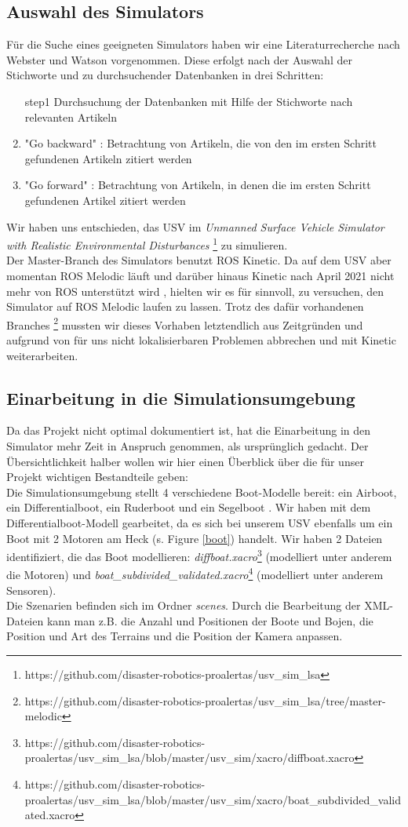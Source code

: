\documentclass[conference]{IEEEtran}
\begin{document}
\subsection{Auswahl des Simulators}
Für die Suche eines geeigneten Simulators haben wir eine Literaturrecherche nach Webster und Watson \cite{b9} vorgenommen. Diese erfolgt nach der Auswahl der Stichworte und zu durchsuchender Datenbanken in drei Schritten:
\begin{enumerate}
	\item[step1] Durchsuchung der Datenbanken mit Hilfe der Stichworte nach relevanten Artikeln
	\item "Go backward" \cite{b9}: Betrachtung von Artikeln, die von den im ersten Schritt gefundenen Artikeln zitiert werden
	\item "Go forward" \cite{b9}: Betrachtung von Artikeln, in denen die im ersten Schritt gefundenen Artikel zitiert werden
\end{enumerate}
Wir haben uns entschieden, das USV im \textit{Unmanned Surface Vehicle Simulator with Realistic Environmental Disturbances} \footnote{https://github.com/disaster-robotics-proalertas/usv\_sim\_lsa} zu simulieren.\\
Der Master-Branch des Simulators benutzt ROS Kinetic. Da auf dem USV aber momentan ROS Melodic läuft und darüber hinaus Kinetic nach April 2021 nicht mehr von ROS unterstützt wird \cite{b10}, hielten wir es für sinnvoll, zu versuchen, den Simulator auf ROS Melodic laufen zu lassen. Trotz des dafür vorhandenen Branches \footnote{https://github.com/disaster-robotics-proalertas/usv\_sim\_lsa/tree/master-melodic} mussten wir dieses Vorhaben letztendlich aus Zeitgründen und aufgrund von für uns nicht lokalisierbaren Problemen abbrechen und mit Kinetic weiterarbeiten.
\subsection{Einarbeitung in die Simulationsumgebung}
Da das Projekt nicht optimal dokumentiert ist, hat die Einarbeitung in den Simulator mehr Zeit in Anspruch genommen, als ursprünglich gedacht. Der Übersichtlichkeit halber wollen wir hier einen Überblick über die für unser Projekt wichtigen Bestandteile geben:\\
Die Simulationsumgebung stellt 4 verschiedene Boot-Modelle bereit: ein Airboot, ein Differentialboot, ein Ruderboot und ein Segelboot \cite{b6}. Wir haben mit dem Differentialboot-Modell gearbeitet, da es sich bei unserem USV ebenfalls um ein Boot mit 2 Motoren am Heck (s. Figure \ref{boot}) handelt. Wir haben 2 Dateien identifiziert, die das Boot modellieren: \textit{diffboat.xacro}\footnote{https://github.com/disaster-robotics-proalertas/usv\_sim\_lsa/blob/master/usv\_sim/xacro/diffboat.xacro} (modelliert unter anderem die Motoren) und \textit{boat\_subdivided\_validated.xacro}\footnote{https://github.com/disaster-robotics-proalertas/usv\_sim\_lsa/blob/master/usv\_sim/xacro/boat\_subdivided\_validated.xacro} (modelliert unter anderem Sensoren).\\
Die Szenarien befinden sich im Ordner \textit{scenes}. Durch die Bearbeitung der XML-Dateien kann man z.B. die Anzahl und Positionen der Boote und Bojen, die Position und Art des Terrains und die Position der Kamera anpassen.
\end{document}
